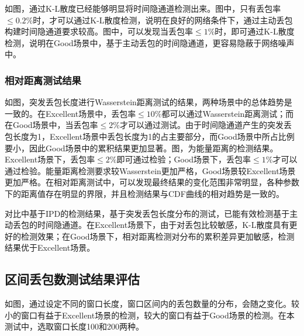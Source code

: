 如图，通过K-L散度已经能够明显将时间隐通道检测出来。图中，只有丢包率$\le 0.2\%$时，才可以通过K-L散度检测，说明在良好的网络条件下，通过主动丢包构建时间隐通道要求较高。图中，可以发现当丢包率$\le 1\%$时，即可通过K-L散度检测，说明在Good场景中，基于主动丢包的时间隐通道，更容易隐蔽于网络噪声中。

\subsubsection{相对距离测试结果}
\label{chap:analyze:result:burst:distance}

如图，突发丢包长度进行Wasserstein距离测试的结果，两种场景中的总体趋势是一致的。在Excellent场景中，丢包率$\le 10\%$都可以通过Wasserstein距离测试；而在Good场景中，当丢包率$\le 2\%$才可以通过测试。由于时间隐通道产生的突发丢包长度为1，Excellent场景中丢包长度为1的占主要部分，而Good场景中所占比例要小，因此Good场景中的累积结果更加显著。图，为能量距离的检测结果。Excellent场景下，丢包率$\le 2\%$即可通过检验；Good场景下，丢包率$\le 1\%$才可以通过检验。能量距离检测要求较Wasserstein更加严格，Good场景较Excellent场景更加严格。在相对距离测试中，可以发现最终结果的变化范围非常明显，各种参数下的距离值存在明显的界限，并且检测结果与CDF曲线的相对趋势是一致的。

对比中基于IPD的检测结果，基于突发丢包长度分布的测试，已能有效检测基于主动丢包的时间隐通道。在Excellent场景下，由于对丢包比较敏感，K-L散度具有更好的检测效果；在Good场景下，相对距离检测对分布的累积差异更加敏感，检测结果优于Excellent场景。

\subsection{区间丢包数测试结果评估}
\label{chap:analyze:result:window}

如图，通过设定不同的窗口长度，窗口区间内的丢包数量的分布，会随之变化。较小的窗口有益于Excellent场景的检测，较大的窗口有益于Good场景的检测。在本测试中，选取窗口长度100和200两种。

